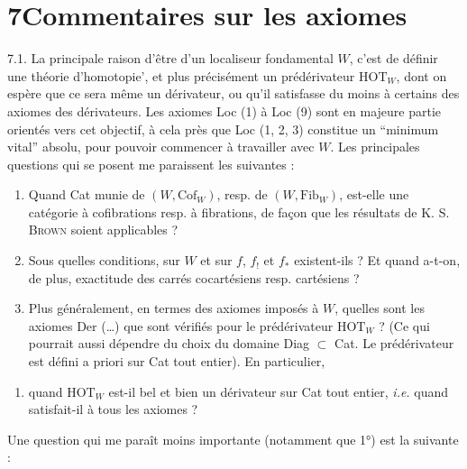 \section*{7\quad Commentaires sur les axiomes}

7.1. La principale raison d'être d'un localiseur fondamental $W$, c'est de définir une théorie d'homotopie’, et plus précisément un prédérivateur $\mathrm{HOT}_W$, dont on espère que ce sera même un dérivateur, ou qu'il satisfasse du moins à certains des axiomes des dérivateurs. Les axiomes Loc (1) à Loc (9) sont en majeure partie orientés vers cet objectif, à cela près que Loc (1, 2, 3) constitue un “minimum vital” absolu, pour pouvoir commencer à travailler avec $W$. Les principales questions qui se posent me paraissent les suivantes : %
\begin{enumerate}[label={}, leftmargin=2.5em]
\item[1)] Quand Cat munie de $(W, \mathrm{Cof}_W)$, resp. de $(W, \mathrm{Fib}_W)$, est-elle une catégorie à cofibrations resp. à fibrations, de façon que les résultats de K. S. \textsc{Brown} soient applicables ?
\item[2)] Sous quelles conditions, sur $W$ et sur $f$, $f_!$ et $f_*$ existent-ils ? Et quand a-t-on, de plus, exactitude des carrés cocartésiens resp. cartésiens ?

\item[3)] Plus généralement, en termes des axiomes imposés à $W$, quelles sont les axiomes Der (\ldots) que sont vérifiés pour le prédérivateur $\mathrm{HOT}_W$ ? (Ce qui pourrait aussi dépendre du choix du domaine Diag $\subset$ Cat. Le prédérivateur est défini a priori sur Cat tout entier). En particulier, %
\end{enumerate}


\begin{enumerate}[label=4)]
\item quand $\mathrm{HOT}_W$ est-il bel et bien un dérivateur sur Cat tout entier, \textit{i.e.} quand satisfait-il à tous les axiomes ?
\end{enumerate}

Une question qui me paraît moins importante (notamment que 1°) est la suivante :

